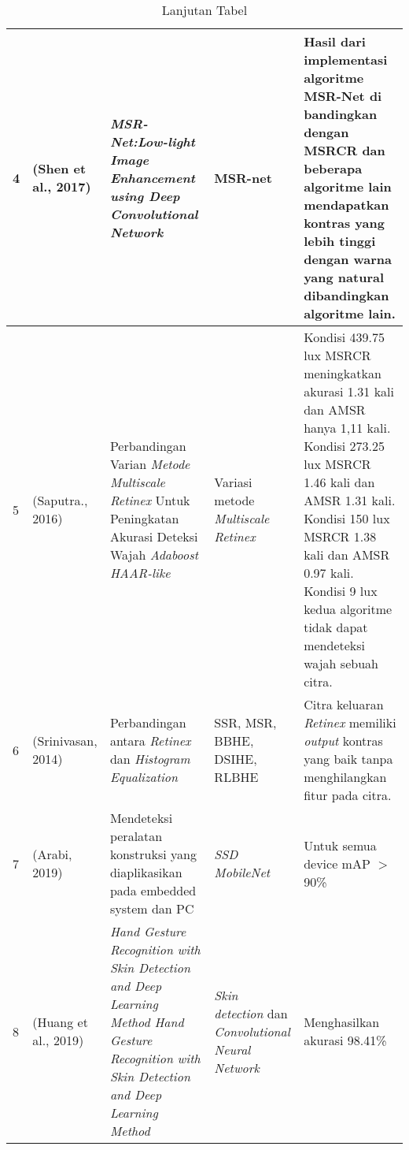 \begin{table}[htpb]
	\caption{Lanjutan Tabel}
	\label{labelku}
	\vspace{0.2cm}
	\begin{tabular}{|p{0.5cm}|p{2cm}|p{3cm}|p{3cm}|p{4cm}|}
		\hline
		4 & (Shen et al., 2017) & \emph{MSR-Net:Low-light Image Enhancement using Deep Convolutional Network} & MSR-net & Hasil dari implementasi algoritme MSR-Net di bandingkan dengan MSRCR dan beberapa algoritme lain mendapatkan kontras yang lebih tinggi dengan warna yang natural dibandingkan algoritme lain.\\
		\hline
		5 & (Saputra., 2016) & Perbandingan Varian \emph{Metode Multiscale Retinex} Untuk Peningkatan Akurasi Deteksi Wajah \emph{Adaboost HAAR-like} & Variasi metode \emph{Multiscale Retinex} & Kondisi 439.75 lux MSRCR meningkatkan akurasi 1.31 kali dan
		AMSR hanya 1,11 kali.
		Kondisi 273.25 lux MSRCR 1.46 kali dan AMSR 1.31 kali.
		Kondisi 150 lux 
		MSRCR 1.38 kali dan AMSR 0.97 kali. 
		Kondisi 9 lux kedua algoritme tidak dapat mendeteksi wajah sebuah citra.\\
		\hline	
		
		6 & (Srinivasan, 2014) & Perbandingan antara \emph{Retinex} dan \emph{Histogram Equalization} & SSR, MSR, BBHE, DSIHE, RLBHE & Citra keluaran \emph{Retinex} memiliki \emph{output} kontras yang baik tanpa menghilangkan fitur pada citra. \\
		\hline	
		7 & (Arabi, 2019) & Mendeteksi peralatan konstruksi yang diaplikasikan pada embedded system dan PC & \emph{SSD MobileNet} & Untuk semua device mAP $>$ 90\% \\
		\hline
		8& (Huang et al., 2019) &\emph{Hand Gesture Recognition with Skin Detection and Deep Learning Method Hand Gesture Recognition with Skin Detection and Deep Learning Method}& \emph{Skin detection} dan \emph{Convolutional Neural Network} & Menghasilkan akurasi 98.41\% \\
		\hline
	\end{tabular}
\end{table}
